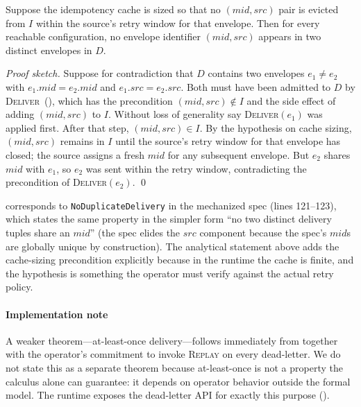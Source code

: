 \begin{theorem}
\label{thm:no-duplicate-delivery}
Suppose the idempotency cache is sized so that no
\((\mathit{mid}, \mathit{src})\) pair is evicted from \(I\) within
the source's retry window for that envelope.  Then for every
reachable configuration, no envelope identifier \((\mathit{mid},
\mathit{src})\) appears in two distinct envelopes in \(D\).
\end{theorem}

\begin{proof}[Proof sketch]
Suppose for contradiction that \(D\) contains two envelopes
\(e_1 \neq e_2\) with \(e_1.\mathit{mid} = e_2.\mathit{mid}\) and
\(e_1.\mathit{src} = e_2.\mathit{src}\).  Both must have been
admitted to \(D\) by \textsc{Deliver}~(),
which has the precondition
\((\mathit{mid}, \mathit{src}) \notin I\) and the side effect of
adding \((\mathit{mid}, \mathit{src})\) to \(I\).  Without loss of
generality say \textsc{Deliver}\((e_1)\) was applied first.  After
that step, \((\mathit{mid}, \mathit{src}) \in I\).  By the
hypothesis on cache sizing, \((\mathit{mid}, \mathit{src})\)
remains in \(I\) until the source's retry window for that envelope
has closed; the source assigns a fresh \(\mathit{mid}\) for any
subsequent envelope.  But \(e_2\) shares \(\mathit{mid}\) with
\(e_1\), so \(e_2\) was sent within the retry window, contradicting
the precondition of \textsc{Deliver}\((e_2)\).
\qed
\end{proof}

 corresponds to
\texttt{NoDuplicateDelivery} in the mechanized spec (lines 121--123),
which states the same property in the simpler form ``no two distinct
delivery tuples share an \(\mathit{mid}\)'' (the spec elides the
\(\mathit{src}\) component because the spec's \(\mathit{mid}\)s are
globally unique by construction).  The
analytical statement above adds the cache-sizing precondition
explicitly because in the runtime the cache is finite, and the
hypothesis is something the operator must verify against the actual
retry policy.

\paragraph{Implementation note}
A weaker theorem—at-least-once delivery—follows immediately from
 together with the operator's commitment
to invoke \textsc{Replay} on every  dead-letter.
We do not state this as a separate theorem because at-least-once is
not a property the calculus alone can guarantee: it depends on
operator behavior outside the formal model.  The runtime exposes
the dead-letter API for exactly this purpose
().

